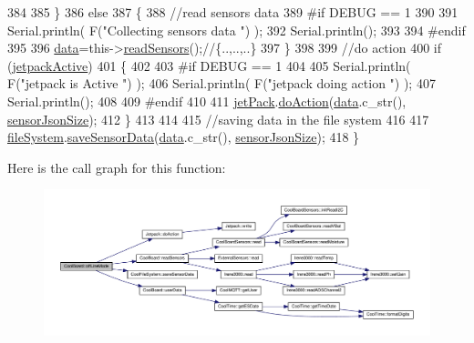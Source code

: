 \begin{DoxyCode}
384                 
385     \}   
386     \textcolor{keywordflow}{else}
387     \{
388         \textcolor{comment}{//read sensors data}
389 \textcolor{preprocessor}{    #if DEBUG == 1}
390 
391         Serial.println( F(\textcolor{stringliteral}{"Collecting sensors data "}) );
392         Serial.println();
393 
394 \textcolor{preprocessor}{    #endif}
395 
396         \hyperlink{classCoolBoard_a427fb753dd8575bdf821c70a5c63d695}{data}=this->\hyperlink{classCoolBoard_ad03abdce2e65f520bbf2cff0f2d083cf}{readSensors}();\textcolor{comment}{//\{..,..,..\}}
397     \}
398 
399     \textcolor{comment}{//do action}
400     \textcolor{keywordflow}{if} (\hyperlink{classCoolBoard_a9be03a913d26e558328935ca3b59a75e}{jetpackActive})
401     \{
402 
403 \textcolor{preprocessor}{    #if DEBUG == 1}
404 
405         Serial.println( F(\textcolor{stringliteral}{"jetpack is Active "}) );
406         Serial.println( F(\textcolor{stringliteral}{"jetpack doing action "}) );
407         Serial.println();
408     
409 \textcolor{preprocessor}{    #endif}
410 
411         \hyperlink{classCoolBoard_a30b1357881b01ccbec676856a91e48e9}{jetPack}.\hyperlink{classJetpack_a86d2e83436ef4b85f4c3a6e85ac785b0}{doAction}(\hyperlink{classCoolBoard_a427fb753dd8575bdf821c70a5c63d695}{data}.c\_str(), \hyperlink{classCoolBoard_a58e4b6072e3ac8b141ec0befb479208e}{sensorJsonSize});
412     \}
413     
414     
415     \textcolor{comment}{//saving data in the file system}
416     
417     \hyperlink{classCoolBoard_a42c2586fbb13ff7f06538e9284e8538d}{fileSystem}.\hyperlink{classCoolFileSystem_a4c560c2ddd40b74b7758e6ceb2c58957}{saveSensorData}(\hyperlink{classCoolBoard_a427fb753dd8575bdf821c70a5c63d695}{data}.c\_str(), 
      \hyperlink{classCoolBoard_a58e4b6072e3ac8b141ec0befb479208e}{sensorJsonSize});
418 \}
\end{DoxyCode}
Here is the call graph for this function\+:\nopagebreak
\begin{figure}[H]
\begin{center}
\leavevmode
\includegraphics[width=350pt]{classCoolBoard_ae6b5e1274d760462290192acea4adca8_cgraph}
\end{center}
\end{figure}
\mbox{\label{classCoolBoard_aa0bbc4bc605e35618d18e68795c61363}} 
